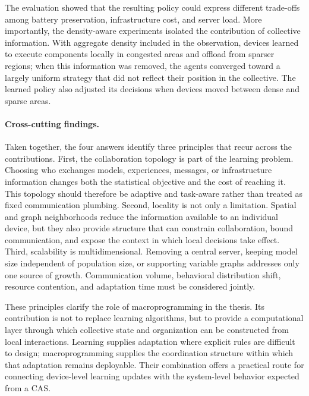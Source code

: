 The evaluation showed that the resulting policy could express different
 trade-offs among battery preservation, infrastructure cost, and server load.
%
More importantly, the density-aware experiments isolated the contribution of
 collective information. 
% 
With aggregate density included in the observation,
 devices learned to execute components locally in congested areas and offload from
 sparser regions; when this information was removed, the agents converged toward a
 largely uniform strategy that did not reflect their position in the collective.
%
The learned policy also adjusted its decisions when devices moved between dense
 and sparse areas.

\paragraph{Cross-cutting findings.}
Taken together, the four answers identify three principles that recur across the
contributions.
%
First, the collaboration topology is part of the learning problem. Choosing who
exchanges models, experiences, messages, or infrastructure information changes
both the statistical objective and the cost of reaching it. This topology should
therefore be adaptive and task-aware rather than treated as fixed communication
plumbing.
%
Second, locality is not only a limitation. Spatial and graph neighborhoods reduce
the information available to an individual device, but they also provide structure
that can constrain collaboration, bound communication, and expose the context in
which local decisions take effect.
%
Third, scalability is multidimensional. Removing a central server, keeping model
size independent of population size, or supporting variable graphs addresses only
one source of growth. Communication volume, behavioral distribution shift,
resource contention, and adaptation time must be considered jointly.

These principles clarify the role of macroprogramming in the thesis.
%
Its contribution is not to replace learning algorithms, but to provide a
computational layer through which collective state and organization can be
constructed from local interactions. Learning supplies adaptation where explicit
rules are difficult to design; macroprogramming supplies the coordination
structure within which that adaptation remains deployable. Their combination
offers a practical route for connecting device-level learning updates with the
system-level behavior expected from a \gls{CAS}.




